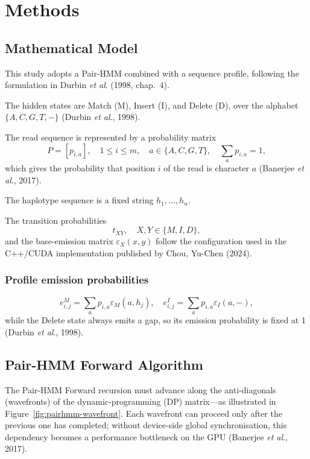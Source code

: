 \documentclass[PhD]{PHlab-thesis}
\begin{document}
\chapter{Methods}

\section{Mathematical Model}
This study adopts a Pair-HMM combined with a sequence profile, following the formulation in Durbin \emph{et al}. (1998, chap.~4).

The hidden states are Match (M), Insert (I), and Delete (D), over the alphabet $\{A,C,G,T,-\}$ (Durbin \emph{et al}., 1998).

The read sequence is represented by a probability matrix
\[
P = [p_{i,a}], \quad 1 \leq i \leq m, \quad a \in \{A,C,G,T\}, \quad \sum_a p_{i,a} = 1,
\]
which gives the probability that position $i$ of the read is character $a$ (Banerjee \emph{et al}., 2017).

The haplotype sequence is a fixed string $h_1, \dots, h_n$.

The transition probabilities
\[
t_{XY}, \quad X,Y \in \{M,I,D\},
\]
and the base-emission matrix $\varepsilon_X(x,y)$ follow the configuration used in the C++/CUDA implementation published by Chou, Yu-Chen (2024).

\subsection{Profile emission probabilities}
\[
e_{i,j}^M = \sum_a p_{i,a} \varepsilon_M(a, h_j), \quad 
e_{i,j}^I = \sum_a p_{i,a} \varepsilon_I(a, -),
\]
while the Delete state always emits a gap, so its emission probability is fixed at 1 (Durbin \emph{et al}., 1998).

\section{Pair-HMM Forward Algorithm}
The Pair-HMM Forward recursion must advance along the anti-diagonals (wavefronts) of the dynamic-programming (DP) matrix—as illustrated in Figure~\ref{fig:pairhmm-wavefront}. Each wavefront can proceed only after the previous one has completed; without device-side global synchronisation, this dependency becomes a performance bottleneck on the GPU (Banerjee \emph{et al}., 2017).
\end{document}
